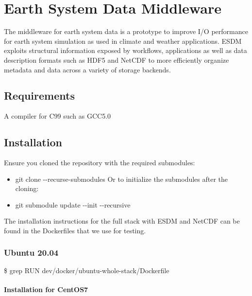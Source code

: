 \section{Earth System Data Middleware}%
\label{earth-system-data-middleware}

The middleware for earth system data is a prototype to improve I/O
performance for earth system simulation as used in climate and weather
applications. ESDM exploits structural information exposed by workflows,
applications as well as data description formats such as HDF5 and NetCDF
to more efficiently organize metadata and data across a variety of
storage backends.


\subsection{Requirements}%
\label{requirements}

A compiler for C99 such as GCC5.0

\subsection{Installation}%
\label{installation}

Ensure you cloned the repository with the required submodules:

\begin{itemize}
  \item git clone -\/-recurse-submodules Or to initialize the submodules after the cloning:
  \item git submodule update -\/-init -\/-recursive
\end{itemize}

The installation instructions for the full stack with ESDM and NetCDF
can be found in the Dockerfiles that we use for testing.

\subsubsection{Ubuntu 20.04}%
\label{ubuntu-2004}

\$ grep RUN dev/docker/ubuntu-whole-stack/Dockerfile

\paragraph{Installation for CentOS7}%
\label{installation-for-centos7}

